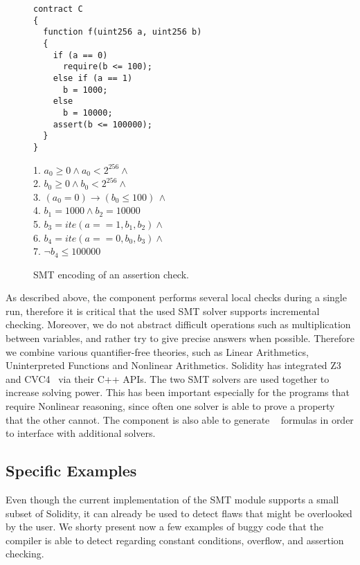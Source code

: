 \begin{figure}
\label{figure:solidity_encoding_1}
\noindent\begin{minipage}{.48\textwidth}
\begin{verbatim}
contract C
{
  function f(uint256 a, uint256 b)
  {
    if (a == 0)
      require(b <= 100);
    else if (a == 1)
      b = 1000;
    else
      b = 10000;
    assert(b <= 100000);
  }
}
\end{verbatim}
\end{minipage}\hfill
\begin{minipage}{.48\textwidth}
1. $a_0 \ge 0 \land a_0 < 2^{256}  \land \phantom{x}$\\
2. $b_0 \ge 0 \land b_0 < 2^{256}  \land \phantom{x}$\\
3. $(a_0 = 0) \rightarrow (b_0 \le 100) \, \land$\\
4. $b_1 = 1000 \land b_2 = 10000$\\
5. $b_3 = ite(a == 1, b_1, b_2) \land \phantom{x}$\\
6. $b_4 = ite(a == 0, b_0, b_3) \land \phantom{x}$\\
7. $\neg b_4 \le 100000$
\end{minipage}
\caption{SMT encoding of an assertion check.}
\end{figure}

As described above, the component performs several local checks during a single
run, therefore it is critical that the used SMT solver supports
incremental checking.
%
Moreover, we do not abstract difficult operations such as multiplication
between variables, and rather try to give precise answers when possible.
%
Therefore we combine various quantifier-free theories, such as Linear
Arithmetics, Uninterpreted Functions and Nonlinear Arithmetics. 
%
Solidity has integrated Z3~\cite{Z3} and CVC4~\cite{CVC4} via their C++ APIs.
%
The two SMT solvers are used together to increase solving power.
%
This has been important especially for the programs that require Nonlinear
reasoning, since often one solver is able to prove a property that the other
cannot.
%
The component is also able to generate ~\cite{SMTLIB}
formulas in order to interface with additional solvers.

\subsection{Specific Examples}

Even though the current implementation of the SMT module supports a small
subset of Solidity, it can already be used to detect flaws that might be
overlooked by the user.
%
We shorty present now a few examples of buggy code that the compiler is able to
detect regarding constant conditions, overflow, and assertion checking.

